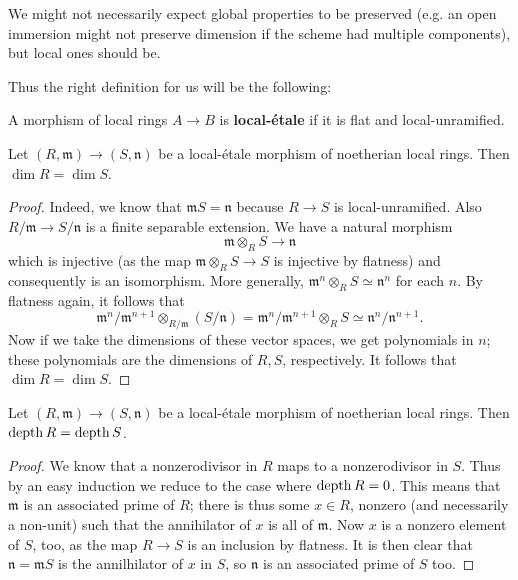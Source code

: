 We might not necessarily expect global properties to be preserved (e.g. an
open immersion might not preserve dimension if the scheme had multiple
components), but local ones should be.

Thus the right definition for us will be the following:
\begin{definition} 
A morphism of local rings $A \to B$ is \textbf{local-\'etale} if it is flat
and local-unramified.
\end{definition} 


\begin{proposition}  \label{dimpreserved}
Let $(R, \mathfrak{m}) \to (S, \mathfrak{n})$ be a local-\'etale morphism of noetherian local
rings. Then $\dim R = \dim S$. 
\end{proposition} 
\begin{proof} 
Indeed, we know that $\mathfrak{m}S = \mathfrak{n}$ because $R \to S$ is
local-unramified.
Also $R/\mathfrak{m}\to S/\mathfrak{n}$ is a finite separable extension.
We have a natural morphism
\[ \mathfrak{m} \otimes_R S \to \mathfrak{n}  \]
which is injective (as the map $\mathfrak{m} \otimes_R S \to S$ is injective by
flatness) and consequently is an isomorphism.
More generally, $\mathfrak{m}^n \otimes_R S \simeq \mathfrak{n}^n$ for each $n$.
By flatness again, it follows that
\begin{equation} \label{thisiso} \mathfrak{m}^n/\mathfrak{m}^{n+1} \otimes_{R/\mathfrak{m}}
(S/\mathfrak{n}) =  \mathfrak{m}^n/\mathfrak{m}^{n+1} \otimes_R S \simeq
\mathfrak{n}^n/\mathfrak{n}^{n+1}. \end{equation}
Now if we take the dimensions of these vector spaces, we get polynomials in
$n$; these polynomials are the dimensions of $R, S$, respectively. It follows
that $\dim R = \dim S$.
\end{proof} 



\begin{proposition} \label{depthpreserved}
Let $(R, \mathfrak{m}) \to (S, \mathfrak{n})$ be a local-\'etale morphism of noetherian local
rings. 
Then $\operatorname{depth} R = \operatorname{depth} S$.
\end{proposition} 
\begin{proof} 
We know that a nonzerodivisor in $R$ maps to a nonzerodivisor in $S$. Thus by
an easy induction we reduce to the case where $\operatorname{depth} R = 0$. 
This means that $\mathfrak{m}$ is an associated prime of $R$; there is thus
some $x \in R$, nonzero (and necessarily a non-unit) such that the annihilator
of $x$ is all of $\mathfrak{m}$. Now $x$ is a nonzero element of $S$, too, as
the map $R \to S$ is an inclusion by flatness. 
It is then clear that $\mathfrak{n} = \mathfrak{m}S$ is the annilhilator of
$x$ in $S$, so $\mathfrak{n}$ is an associated prime of $S$ too.
\end{proof} 

